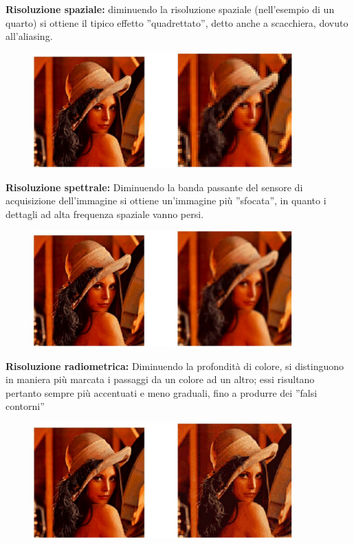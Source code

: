\begin{trivlist}
    \item \textbf{Risoluzione spaziale:} diminuendo la risoluzione spaziale
    (nell'esempio di un quarto) si ottiene il tipico effetto ”quadrettato”,
    detto anche a scacchiera, dovuto all'aliasing.
    \begin{figure}[H]
        \centering
        \includegraphics[width=10cm, keepaspectratio]{capitoli/immagini/imgs/esempio_risoluzione_spaziale.jpg}
    \end{figure}

    \item \textbf{Risoluzione spettrale:} Diminuendo la banda passante del
    sensore di acquisizione dell'immagine si ottiene un'immagine più ”sfocata”,
    in quanto i dettagli ad alta frequenza spaziale vanno persi.
    \begin{figure}[H]
        \centering
        \includegraphics[width=10cm, keepaspectratio]{capitoli/immagini/imgs/esempio_risoluzione_spettrale.jpg}
    \end{figure}

    \item \textbf{Risoluzione radiometrica:} Diminuendo la profondità di colore,
    si distinguono in maniera più marcata i passaggi da un colore ad un altro;
    essi risultano pertanto sempre più accentuati e meno graduali, fino a
    produrre dei ”falsi contorni”
    \begin{figure}[H]
        \centering
        \includegraphics[width=10cm, keepaspectratio]{capitoli/immagini/imgs/esempio_risoluzione_radiometrica.jpg}
    \end{figure}
\end{trivlist}

